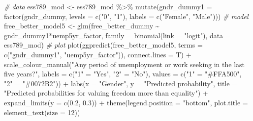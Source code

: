 \documentclass[
]{article}
\newenvironment{Shaded}{\begin{snugshade}}{\end{snugshade}}
\newcommand{\AttributeTok}[1]{\textcolor[rgb]{0.77,0.63,0.00}{#1}}
\newcommand{\CommentTok}[1]{\textcolor[rgb]{0.56,0.35,0.01}{\textit{#1}}}
\newcommand{\DecValTok}[1]{\textcolor[rgb]{0.00,0.00,0.81}{#1}}
\newcommand{\FloatTok}[1]{\textcolor[rgb]{0.00,0.00,0.81}{#1}}
\newcommand{\FunctionTok}[1]{\textcolor[rgb]{0.00,0.00,0.00}{#1}}
\newcommand{\NormalTok}[1]{#1}
\newcommand{\OtherTok}[1]{\textcolor[rgb]{0.56,0.35,0.01}{#1}}
\newcommand{\SpecialCharTok}[1]{\textcolor[rgb]{0.00,0.00,0.00}{#1}}
\newcommand{\StringTok}[1]{\textcolor[rgb]{0.31,0.60,0.02}{#1}}
\begin{document}
\begin{Shaded}
\begin{Highlighting}[]
\CommentTok{\# data }
\NormalTok{ess789\_mod }\OtherTok{\textless{}{-}}\NormalTok{ ess789\_mod }\SpecialCharTok{\%\textgreater{}\%}
  \FunctionTok{mutate}\NormalTok{(}\AttributeTok{gndr\_dummy1 =} \FunctionTok{factor}\NormalTok{(gndr\_dummy, }\AttributeTok{levels =} \FunctionTok{c}\NormalTok{(}\StringTok{"0"}\NormalTok{, }\StringTok{"1"}\NormalTok{), }
                             \AttributeTok{labels =} \FunctionTok{c}\NormalTok{(}\StringTok{"Female"}\NormalTok{, }\StringTok{"Male"}\NormalTok{)))}
\CommentTok{\# model }
\NormalTok{free\_better\_model5 }\OtherTok{\textless{}{-}} \FunctionTok{glm}\NormalTok{(free\_better\_dummy }\SpecialCharTok{\textasciitilde{}}\NormalTok{ gndr\_dummy1}\SpecialCharTok{*}\NormalTok{uemp5yr\_factor,}
                         \AttributeTok{family =} \FunctionTok{binomial}\NormalTok{(}\AttributeTok{link =} \StringTok{"logit"}\NormalTok{),}
                         \AttributeTok{data =}\NormalTok{ ess789\_mod)}
\CommentTok{\# plot }
\FunctionTok{plot}\NormalTok{(}\FunctionTok{ggpredict}\NormalTok{(free\_better\_model5, }\AttributeTok{terms =} \FunctionTok{c}\NormalTok{(}\StringTok{"gndr\_dummy1"}\NormalTok{, }\StringTok{"uemp5yr\_factor"}\NormalTok{)),}
     \AttributeTok{connect.lines =}\NormalTok{ T) }\SpecialCharTok{+}
  \FunctionTok{scale\_colour\_manual}\NormalTok{(}\StringTok{"Any period of unemployment or work seeking in the last five years?"}\NormalTok{,}
                        \AttributeTok{labels =} \FunctionTok{c}\NormalTok{(}\StringTok{"1"} \OtherTok{=} \StringTok{"Yes"}\NormalTok{,}
                                   \StringTok{"2"} \OtherTok{=} \StringTok{"No"}\NormalTok{),}
                        \AttributeTok{values =} \FunctionTok{c}\NormalTok{(}\StringTok{"1"} \OtherTok{=} \StringTok{"\#FFA500"}\NormalTok{,}
                                   \StringTok{"2"} \OtherTok{=} \StringTok{"\#0072B2"}\NormalTok{)) }\SpecialCharTok{+}
  \FunctionTok{labs}\NormalTok{(}\AttributeTok{x =} \StringTok{"Gender"}\NormalTok{, }\AttributeTok{y =} \StringTok{"Predicted probability"}\NormalTok{, }
       \AttributeTok{title =} \StringTok{"Predicted probabilities for valuing freedom more than equality"}\NormalTok{) }\SpecialCharTok{+}
  \FunctionTok{expand\_limits}\NormalTok{(}\AttributeTok{y =} \FunctionTok{c}\NormalTok{(}\FloatTok{0.2}\NormalTok{, }\FloatTok{0.3}\NormalTok{)) }\SpecialCharTok{+}
  \FunctionTok{theme}\NormalTok{(}\AttributeTok{legend.position =} \StringTok{"bottom"}\NormalTok{, }
        \AttributeTok{plot.title =} \FunctionTok{element\_text}\NormalTok{(}\AttributeTok{size =} \DecValTok{12}\NormalTok{))}
\end{Highlighting}
\end{Shaded}
\end{document}
